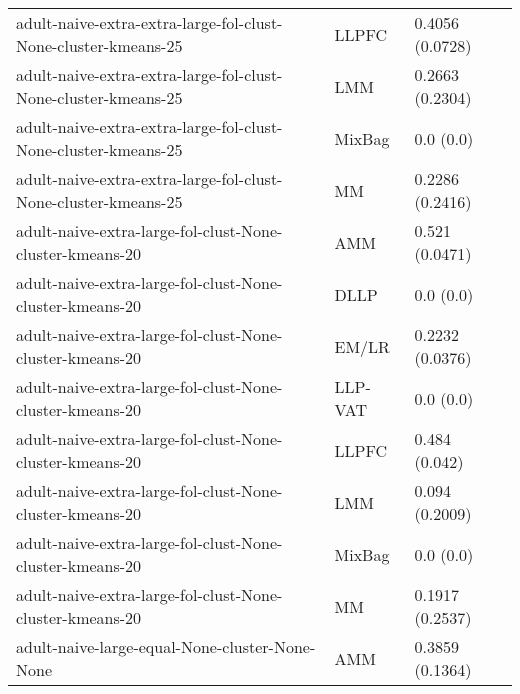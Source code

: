 \begin{longtable}{lll}
                                               adult-naive-extra-extra-large-fol-clust-None-cluster-kmeans-25 &     LLPFC &                       0.4056 (0.0728) \\
                                               adult-naive-extra-extra-large-fol-clust-None-cluster-kmeans-25 &       LMM &                       0.2663 (0.2304) \\
                                               adult-naive-extra-extra-large-fol-clust-None-cluster-kmeans-25 &    MixBag &                             0.0 (0.0) \\
                                               adult-naive-extra-extra-large-fol-clust-None-cluster-kmeans-25 &        MM &                       0.2286 (0.2416) \\
                                                     adult-naive-extra-large-fol-clust-None-cluster-kmeans-20 &       AMM &                        0.521 (0.0471) \\
                                                     adult-naive-extra-large-fol-clust-None-cluster-kmeans-20 &      DLLP &                             0.0 (0.0) \\
                                                     adult-naive-extra-large-fol-clust-None-cluster-kmeans-20 &     EM/LR &                       0.2232 (0.0376) \\
                                                     adult-naive-extra-large-fol-clust-None-cluster-kmeans-20 &   LLP-VAT &                             0.0 (0.0) \\
                                                     adult-naive-extra-large-fol-clust-None-cluster-kmeans-20 &     LLPFC &                         0.484 (0.042) \\
                                                     adult-naive-extra-large-fol-clust-None-cluster-kmeans-20 &       LMM &                        0.094 (0.2009) \\
                                                     adult-naive-extra-large-fol-clust-None-cluster-kmeans-20 &    MixBag &                             0.0 (0.0) \\
                                                     adult-naive-extra-large-fol-clust-None-cluster-kmeans-20 &        MM &                       0.1917 (0.2537) \\
                                                               adult-naive-large-equal-None-cluster-None-None &       AMM &                       0.3859 (0.1364) \\

\end{longtable}
